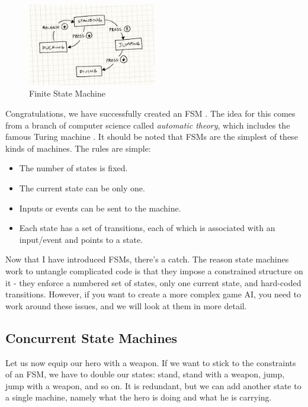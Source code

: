 \documentclass[a4paper,12pt,openright]{book}
\begin{document}
\begin{figure}[h]
\begin{center}
\includegraphics[width=0.5\textwidth]{Images/state_FSM.png}
\end{center}
\caption{Finite State Machine \cite{GameProgrammingPattersFMS}}
\label{pic1}
\end{figure}

Congratulations, we have successfully created an FSM \cite{GameProgrammingPattersFMS}. The idea for this comes from a branch of computer science called \emph{automatic theory}, which includes the famous Turing machine \cite{TuringMachine}. It should be noted that FSMs are the simplest of these kinds of machines. The rules are simple:
\begin{itemize} 
    \item The number of states is fixed. 
    \item The current state can be only one. 
    \item Inputs or events can be sent to the machine. 
    \item Each state has a set of transitions, each of which is associated with an input/event and points to a state.
\end{itemize}

Now that I have introduced FSMs, there's a catch. 
The reason state machines work to untangle complicated code is that they impose a constrained structure on it - they enforce a numbered set of states, only one current state, and hard-coded transitions. However, if you want to create a more complex game AI, you need to work around these issues, and we will look at them in more detail.

\subsection{Concurrent State Machines}

Let us now equip our hero with a weapon. If we want to stick to the constraints of an FSM, we have to double our states: stand, stand with a weapon, jump, jump with a weapon, and so on. It is redundant, but we can add another state to a single machine, namely what the hero is doing and what he is carrying.
\end{document}
